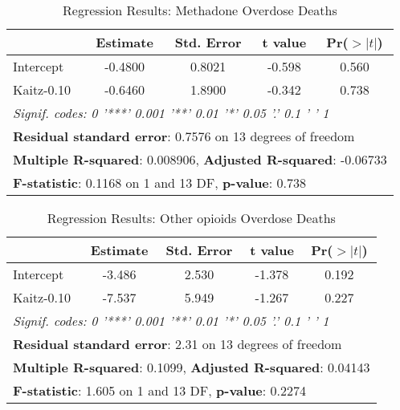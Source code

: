 \documentclass[12pt,a4paper]{article}
\begin{document}
\begin{table}[ht]
    \centering
    \begin{tabular}{lcccc}
    \toprule
     & \textbf{Estimate} & \textbf{Std. Error} & \textbf{t value} & \textbf{Pr($>|t|$)} \\
    \midrule
    Intercept  & -0.4800 & 0.8021 & -0.598 & 0.560 \\
    Kaitz-0.10 & -0.6460 & 1.8900 & -0.342 & 0.738 \\
    \midrule
    \multicolumn{5}{l}{\textit{Signif. codes:  0 '***' 0.001 '**' 0.01 '*' 0.05 '.' 0.1 ' ' 1}} \\
    \midrule
    \multicolumn{5}{l}{\textbf{Residual standard error}: 0.7576 on 13 degrees of freedom} \\
    \multicolumn{5}{l}{\textbf{Multiple R-squared}: 0.008906, \textbf{Adjusted R-squared}: -0.06733} \\
    \multicolumn{5}{l}{\textbf{F-statistic}: 0.1168 on 1 and 13 DF, \textbf{p-value}: 0.738} \\
    \bottomrule
    \end{tabular}
    \caption{Regression Results: Methadone Overdose Deaths}
    \label{tab:regression_results_methadone}
\end{table}

\newpage

\begin{table}[ht]
    \centering
    \begin{tabular}{lcccc}
    \toprule
     & \textbf{Estimate} & \textbf{Std. Error} & \textbf{t value} & \textbf{Pr($>|t|$)} \\
    \midrule
    Intercept  & -3.486 & 2.530 & -1.378 & 0.192 \\
    Kaitz-0.10 & -7.537 & 5.949 & -1.267 & 0.227 \\
    \midrule
    \multicolumn{5}{l}{\textit{Signif. codes:  0 '***' 0.001 '**' 0.01 '*' 0.05 '.' 0.1 ' ' 1}} \\
    \midrule
    \multicolumn{5}{l}{\textbf{Residual standard error}: 2.31 on 13 degrees of freedom} \\
    \multicolumn{5}{l}{\textbf{Multiple R-squared}: 0.1099, \textbf{Adjusted R-squared}: 0.04143} \\
    \multicolumn{5}{l}{\textbf{F-statistic}: 1.605 on 1 and 13 DF, \textbf{p-value}: 0.2274} \\
    \bottomrule
    \end{tabular}
    \caption{Regression Results: Other opioids Overdose Deaths}
    \label{tab:regression_results_otheropioids}
\end{table}
\end{document}
